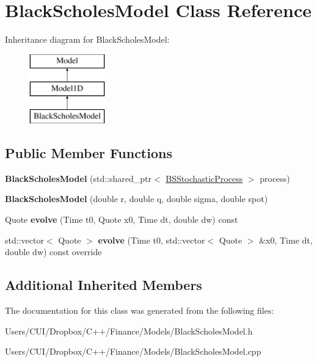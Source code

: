 \hypertarget{class_black_scholes_model}{}\section{Black\+Scholes\+Model Class Reference}
\label{class_black_scholes_model}
Inheritance diagram for Black\+Scholes\+Model\+:\begin{figure}[H]
\begin{center}
\leavevmode
\includegraphics[height=3.000000cm]{class_black_scholes_model}
\end{center}
\end{figure}
\subsection*{Public Member Functions}
\begin{DoxyCompactItemize}
\item 
\hypertarget{class_black_scholes_model_a5cc9ce0cdb0f040da65677b2c07f09b5}{}\label{class_black_scholes_model_a5cc9ce0cdb0f040da65677b2c07f09b5} 
{\bfseries Black\+Scholes\+Model} (std\+::shared\+\_\+ptr$<$ \hyperlink{class_b_s_stochastic_process}{B\+S\+Stochastic\+Process} $>$ process)
\item 
\hypertarget{class_black_scholes_model_a59aa736bd849bc59fed035f702e9813b}{}\label{class_black_scholes_model_a59aa736bd849bc59fed035f702e9813b} 
{\bfseries Black\+Scholes\+Model} (double r, double q, double sigma, double spot)
\item 
\hypertarget{class_black_scholes_model_abcbe5f02a1820adf876b1981c78dc43a}{}\label{class_black_scholes_model_abcbe5f02a1820adf876b1981c78dc43a} 
Quote {\bfseries evolve} (Time t0, Quote x0, Time dt, double dw) const
\item 
\hypertarget{class_black_scholes_model_ae7ece51fd9f0eac3f77975cff857216d}{}\label{class_black_scholes_model_ae7ece51fd9f0eac3f77975cff857216d} 
std\+::vector$<$ Quote $>$ {\bfseries evolve} (Time t0, std\+::vector$<$ Quote $>$ \&x0, Time dt, double dw) const override
\end{DoxyCompactItemize}
\subsection*{Additional Inherited Members}


The documentation for this class was generated from the following files\+:\begin{DoxyCompactItemize}
\item 
Users/\+C\+U\+I/\+Dropbox/\+C++/\+Finance/\+Models/Black\+Scholes\+Model.\+h\item 
Users/\+C\+U\+I/\+Dropbox/\+C++/\+Finance/\+Models/Black\+Scholes\+Model.\+cpp\end{DoxyCompactItemize}

